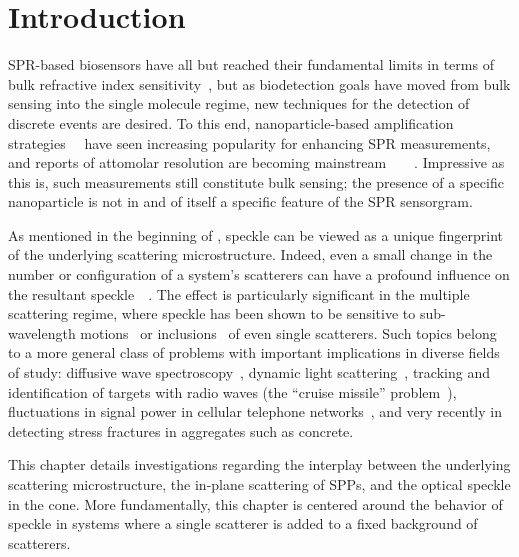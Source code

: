 \section{Introduction}
SPR-based biosensors have all but reached their fundamental limits in terms of
bulk refractive index sensitivity~\cite{piliarik2009surface}, but as
biodetection goals have moved from bulk sensing into the single molecule
regime, new techniques for the detection of discrete events are desired.  To
this end, nanoparticle-based amplification
strategies~\cite{wang2005nanomaterial}~\cite{jain2007review} have seen
increasing popularity for enhancing SPR measurements, and reports of attomolar
resolution are becoming
mainstream~\cite{fang2006attomole}~\cite{krishnan2011attomolar}~\cite{kwon2012nanoparticle}~\cite{sim2010attomolar}.
Impressive as this is, such measurements still constitute bulk sensing; the
presence of a specific nanoparticle is not in and of itself a specific feature
of the SPR sensorgram.

As mentioned in the beginning of , speckle can be viewed as
a unique fingerprint~\cite{ravikanth2001physical} of the underlying scattering
microstructure.  Indeed, even a small change in the number or configuration of
a system's scatterers can have a profound influence on the resultant
speckle~\cite{berkovits1994correlations}~\cite{feng1986sensitivity}.  The
effect is particularly significant in the multiple scattering regime, where
speckle has been shown to be sensitive to sub-wavelength
motions~\cite{berkovits1991sensitivity} or
inclusions~\cite{berkovits1990theory} of even single scatterers.  Such topics
belong to a more general class of problems with important implications in
diverse fields of study: diffusive wave spectroscopy~\cite{pine1988diffusing},
dynamic light scattering~\cite{berne2000dynamic}, tracking and identification
of targets with radio waves (the ``cruise missile''
problem~\cite{atkins1991neural}), fluctuations in signal power in cellular
telephone networks~\cite{abdi2001estimation}, and very recently in detecting
stress fractures in aggregates such as concrete.

This chapter details investigations regarding the interplay between the
underlying scattering microstructure, the in-plane scattering of SPPs, and
the optical speckle in the cone.  More fundamentally, this chapter is
centered around the behavior of speckle in systems where a single scatterer
is added to a fixed background of scatterers.
